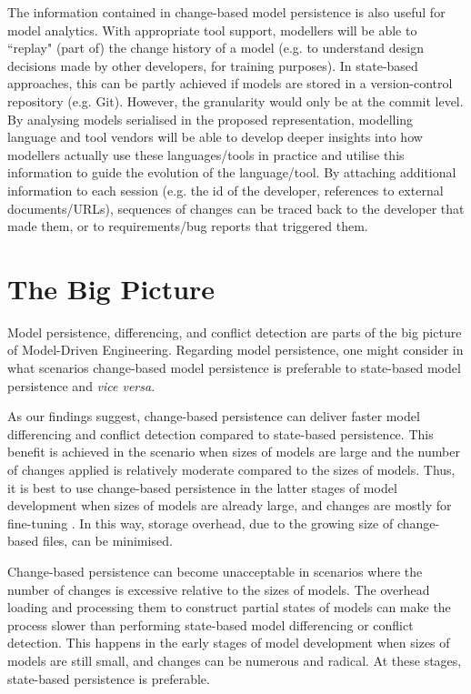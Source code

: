 The information contained in change-based model persistence is also useful for model analytics. With appropriate tool support, modellers will be able to ``replay" (part of) the change history of a model (e.g. to understand design decisions made by other developers, for training purposes). In state-based approaches, this can be partly achieved if models are stored in a version-control repository (e.g. Git). However, the granularity would only be at the commit level. By analysing models serialised in the proposed representation, modelling language and tool vendors will be able to develop deeper insights into how modellers actually use these languages/tools in practice and utilise this information to guide the evolution of the language/tool. By attaching additional information to each session (e.g. the id of the developer, references to external documents/URLs), sequences of changes can be traced back to the developer that made them, or to requirements/bug reports that triggered them.

\section{The Big Picture}
\label{sec:the_big_picture}

Model persistence, differencing, and conflict detection are parts of the big picture of Model-Driven Engineering. Regarding model persistence, one might consider in what scenarios change-based model persistence is preferable to state-based model persistence and \emph{vice versa}.

As our findings suggest, change-based persistence can deliver faster model differencing and conflict detection compared to state-based persistence. This benefit is achieved in the scenario when sizes of models are large and the number of changes applied is relatively moderate compared to the sizes of models. Thus, it is best to use change-based persistence in the latter stages of model development when sizes of models are already large, and changes are mostly for fine-tuning \cite{selic2003pragmatics}. In this way, storage overhead, due to the growing size of change-based files, can be minimised. 

Change-based persistence can become unacceptable in scenarios where the number of changes is excessive relative to the sizes of models. The overhead loading and processing them to construct partial states of models can make the process slower than performing state-based model differencing or conflict detection. This happens in the early stages of model development when sizes of models are still small, and changes can be numerous and radical. At these stages, state-based persistence is preferable.


